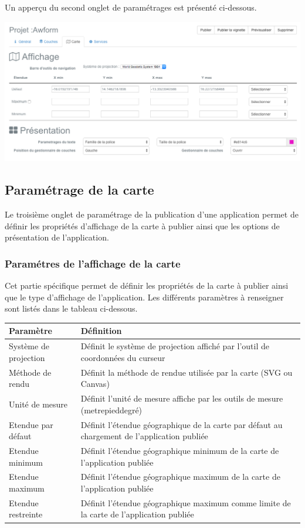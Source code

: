 \documentclass[letterpaper,10pt,french]{sphinxmanual}
\begin{document}
Un apperçu du second onglet de paramétrages est présenté ci-dessous.

\includegraphics[width=1.000\linewidth]{publisher-map-conf.png}


\subsection{Paramétrage de la carte}
\label{apps/appconfig:parametrage-de-la-carte}
Le troisième onglet de paramétrage de la publication d’une application
permet de définir les propriétés d'affichage de la carte à publier
ainsi que les options de présentation de l'application.


\subsubsection{Paramétres de l'affichage de la carte}
\label{apps/appconfig:parametres-de-l-affichage-de-la-carte}
Cet partie spécifique permet de définir les propriétés de la carte à
publier ainsi que le type d'affichage de l'application. Les différents
paramètres à renseigner sont listés dans le tableau ci-dessous.

\begin{tabulary}{\linewidth}{|L|L|}
\hline

\textbf{Paramètre}
 & 
\textbf{Définition}
\\
\hline
Système de projection
 & 
Définit le système de projection affiché par l'outil de coordonnées du curseur
\\
\hline
Méthode de rendu
 & 
Définit la méthode de rendue utilisée par la carte (SVG ou Canvas)
\\
\hline
Unité de mesure
 & 
Définit l'unité de mesure affiche par les outils de mesure (metre\textbar{}pied\textbar{}degré)
\\
\hline
Etendue par défaut
 & 
Définit l'étendue géographique de la carte par défaut au chargement de l'application publiée
\\
\hline
Etendue minimum
 & 
Définit l'étendue géographique minimum de la carte de l'application publiée
\\
\hline
Etendue maximum
 & 
Définit l'étendue géographique maximum de la carte de l'application publiée
\\
\hline
Etendue restreinte
 & 
Définit l'étendue géographique maximum comme limite de la carte de l'application publiée
\\
\hline\end{tabulary}
\end{document}
